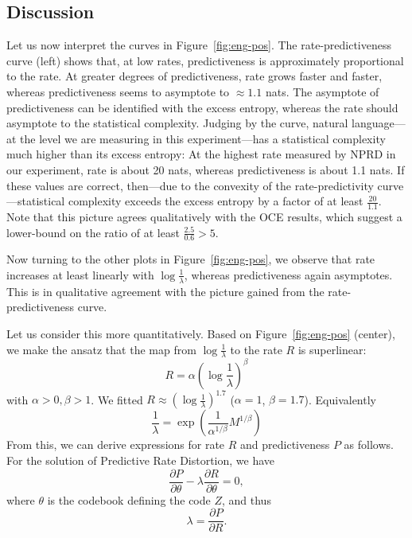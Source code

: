 \documentclass[11pt,letterpaper]{article}
\newif \ifcomment
\newcommand\rljf[1]{\ifcomment{{\color{blue}(#1)}}\else{}\fi}
\begin{document}
\subsection{Discussion}
Let us now interpret the curves in Figure~\ref{fig:eng-pos}. \rljf{What is predictiveness? Excess entropy?}
The rate-predictiveness curve (left) shows that, at low rates, predictiveness is approximately proportional to the rate.
At greater degrees of predictiveness, rate grows faster and faster, whereas predictiveness seems to asymptote to $\approx 1.1$ nats.
The asymptote of predictiveness can be identified with the excess entropy, whereas the rate should asymptote to the statistical complexity.
Judging by the curve, natural language---at the level we are measuring in this experiment---has a statistical complexity much higher than its excess entropy:
At the highest rate measured by NPRD in our experiment, rate is about 20 nats, whereas predictiveness is about 1.1 nats.
If these values are correct, then---due to the convexity of the rate-predictivity curve---statistical complexity exceeds the excess entropy by a factor of at least $\frac{20}{1.1}$. \rljf{Wow, is this true for any other natural processes?}
Note that this picture agrees qualitatively with the OCE results, which suggest a lower-bound on the ratio of at least $\frac{2.5}{0.6} > 5$.

Now turning to the other plots in Figure~\ref{fig:eng-pos}, we observe that rate increases at least linearly with $\log\frac{1}{\lambda}$, whereas predictiveness again asymptotes.
This is in qualitative agreement with the picture gained from the rate-predictiveness curve.


Let us consider this more quantitatively.
Based on Figure~\ref{fig:eng-pos} (center), we make the ansatz that the map from $\log\frac{1}{\lambda}$ to the rate $R$ is superlinear:
\rljf{Was there a change of variables between $\beta$ and $\lambda$ here?}
\begin{equation}\label{eq:r-alpha-beta}
	R = \alpha \left(\log\frac{1}{\lambda}\right)^\beta
\end{equation}
	with $\alpha>0, \beta>1$.
We fitted $R \approx \left(\log\frac{1}{\lambda}\right)^{1.7}$ ($\alpha=1$, $\beta=1.7$).
Equivalently
\begin{equation}
\frac{1}{\lambda} = \exp\left(\frac{1}{\alpha^{1/\beta}} M^{1/\beta}\right)
\end{equation}
From this, we can derive expressions for rate $R$ and predictiveness $P$ as follows.
For the solution of Predictive Rate Distortion, we have
\begin{equation}
	\frac{\partial P}{\partial \theta} - \lambda \frac{\partial R}{\partial \theta} = 0,
\end{equation}
where $\theta$ is the codebook defining the code $Z$, and thus
\begin{equation}
\lambda =	\frac{\partial P}{\partial R}.
\end{equation}
\end{document}
